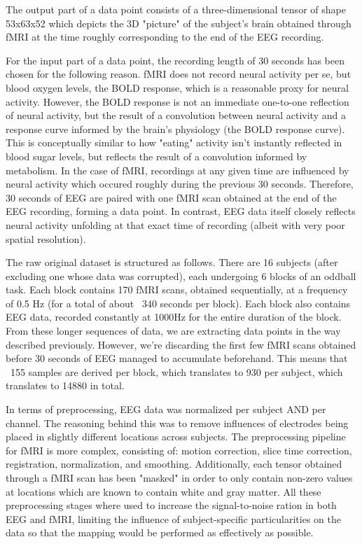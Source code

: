 \documentclass{article}
\begin{document}
The output part of a data point consists of a three-dimensional tensor of shape 53x63x52 which depicts the 3D "picture" of the subject's brain obtained through fMRI at the time roughly corresponding to the end of the EEG recording.

For the input part of a data point, the recording length of 30 seconds has been chosen for the following reason. fMRI does not record neural activity per se, but blood oxygen levels, the BOLD response, which is a reasonable proxy for neural activity. However, the BOLD response is not an immediate one-to-one reflection of neural activity, but the result of a convolution between neural activity and a response curve informed by the brain's physiology (the BOLD response curve). This is conceptually similar to how "eating" activity isn't instantly reflected in blood sugar levels, but reflects the result of a convolution informed by metabolism. In the case of fMRI, recordings at any given time are influenced by neural activity which occured roughly during the previous 30 seconds. Therefore, 30 seconds of EEG are paired with one fMRI scan obtained at the end of the EEG recording, forming a data point. In contrast, EEG data itself closely reflects neural activity unfolding at that exact time of recording (albeit with very poor spatial resolution).

The raw original dataset is structured as follows. There are 16 subjects (after excluding one whose data was corrupted), each undergoing 6 blocks of an oddball task. Each block contains 170 fMRI scans, obtained sequentially, at a frequency of 0.5 Hz (for a total of about ~340 seconds per block). Each block also contains EEG data, recorded constantly at 1000Hz for the entire duration of the block. From these longer sequences of data, we are extracting data points in the way described previously. However, we're discarding the first few fMRI scans obtained before 30 seconds of EEG managed to accumulate beforehand. This means that ~155 samples are derived per block, which translates to 930 per subject, which translates to 14880 in total.

In terms of preprocessing, EEG data was normalized per subject AND per channel. The reasoning behind this was to remove influences of electrodes being placed in slightly different locations across subjects. The preprocessing pipeline for fMRI is more complex, consisting of: motion correction, slice time correction, registration, normalization, and smoothing. Additionally, each tensor obtained through a fMRI scan has been "masked" in order to only contain non-zero values at locations which are known to contain white and gray matter. All these preprocessing stages where used to increase the signal-to-noise ration in both EEG and fMRI, limiting the influence of subject-specific particularities on the data so that the mapping would be performed as effectively as possible.
\end{document}
